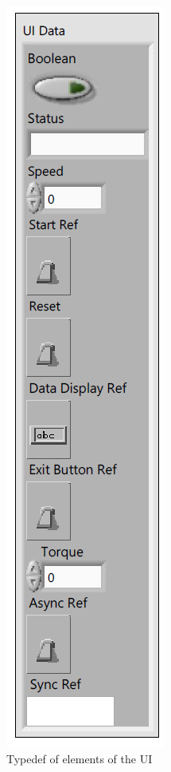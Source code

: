 \begin{multicols}{2}
\begin{figure}[H]
    \includegraphics[scale=0.5]{vis/UI.PNG}
    \caption{Typedef of elements of the UI}
    \label{fig:UI}
\end{figure}
\end{multicols}
